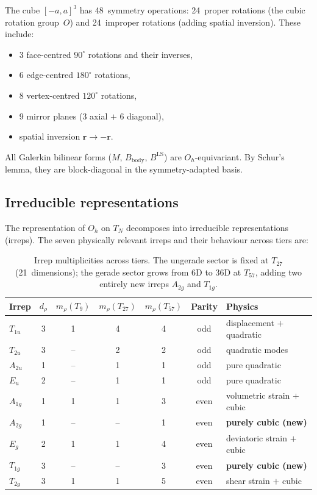 \documentclass[11pt,a4paper]{article}
\newcommand{\br}{\bm{r}}
\newcommand{\Oh}{O_h}
\newcommand{\BLS}{B^{\mathrm{LS}}}
\theoremstyle{plain}
\theoremstyle{definition}
\theoremstyle{remark}
\begin{document}
The cube $[-a,a]^3$ has 48~symmetry operations: 24~proper rotations
(the cubic rotation group~$O$) and 24~improper rotations (adding
spatial inversion).  These include:
\begin{itemize}[nosep]
  \item 3 face-centred $90^\circ$ rotations and their inverses,
  \item 6 edge-centred $180^\circ$ rotations,
  \item 8 vertex-centred $120^\circ$ rotations,
  \item 9 mirror planes (3 axial $+$ 6 diagonal),
  \item spatial inversion $\br \to -\br$.
\end{itemize}
All Galerkin bilinear forms ($M$, $B_{\mathrm{body}}$, $\BLS$) are
$\Oh$-equivariant.  By Schur's lemma, they are block-diagonal in the
symmetry-adapted basis.

\subsection{Irreducible representations}

The representation of $\Oh$ on $T_N$ decomposes into irreducible
representations (irreps).  The seven physically relevant irreps and
their behaviour across tiers are:

\begin{table}[h]
\centering
\begin{tabular}{lcccccl}
\toprule
Irrep & $d_\rho$ & $m_\rho(T_9)$ & $m_\rho(T_{27})$
  & $m_\rho(T_{57})$ & Parity & Physics \\
\midrule
$T_{1u}$ & 3 & 1 & 4 & 4 & odd & displacement $+$ quadratic \\
$T_{2u}$ & 3 & -- & 2 & 2 & odd & quadratic modes \\
$A_{2u}$ & 1 & -- & 1 & 1 & odd & pure quadratic \\
$E_u$    & 2 & -- & 1 & 1 & odd & pure quadratic \\[4pt]
$A_{1g}$ & 1 & 1 & 1 & 3 & even & volumetric strain $+$ cubic \\
$A_{2g}$ & 1 & -- & -- & 1 & even & \textbf{purely cubic (new)} \\
$E_g$    & 2 & 1 & 1 & 4 & even & deviatoric strain $+$ cubic \\
$T_{1g}$ & 3 & -- & -- & 3 & even & \textbf{purely cubic (new)} \\
$T_{2g}$ & 3 & 1 & 1 & 5 & even & shear strain $+$ cubic \\
\bottomrule
\end{tabular}
\caption{Irrep multiplicities across tiers.  The ungerade sector is
fixed at $T_{27}$ (21~dimensions); the gerade sector grows from
6D to 36D at $T_{57}$, adding two entirely new irreps $A_{2g}$ and
$T_{1g}$.}
\label{tab:irreps-tiers}
\end{table}
\end{document}
